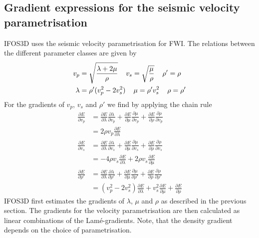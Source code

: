\subsection{Gradient expressions for the seismic velocity parametrisation}
IFOS3D uses the seismic velocity parametrisation for FWI. The relations between the different parameter classes are given by
\begin{equation}
\begin{split}
v_p & =\sqrt{\frac{\lambda+2\mu}{\rho}} \hspace{0.4cm} v_s=\sqrt{\frac{\mu}{\rho}} \hspace{0.4cm} \rho'=\rho \\
\lambda & =\rho'(v_p^2-2v_s^2) \hspace{0.4cm} \mu=\rho' v_s^2 \hspace{0.4cm} \rho=\rho'
\end{split} \end{equation}
For the gradients of $v_p$, $v_s$ and $\rho'$ we find by applying the chain rule
\begin{equation}
\begin{split}
 \frac{\partial E}{\partial v_p} & =\frac{\partial E}{\partial\lambda}\frac{\partial\lambda}{\partial v_p}+\frac{\partial E}{\partial\mu}\frac{\partial\mu}{\partial v_p}+\frac{\partial E}{\partial\rho}\frac{\partial\rho}{\partial v_p}
\\
& = 2\rho v_p\frac{\partial E}{\partial\lambda}
\\
\frac{\partial E}{\partial v_s}& =\frac{\partial E}{\partial\lambda}\frac{\partial\lambda}{\partial v_s}+\frac{\partial E}{\partial\mu}\frac{\partial\mu}{\partial v_s}+\frac{\partial E}{\partial\rho}\frac{\partial\rho}{\partial v_s}
\\
& = -4\rho v_s\frac{\partial E}{\partial\lambda}+2\rho v_s\frac{\partial E}{\partial\mu}
\\
\frac{\partial E}{\partial\rho'}& =\frac{\partial E}{\partial\lambda}\frac{\partial\lambda}{\partial\rho'}+\frac{\partial E}{\partial\mu}\frac{\partial\mu}{\partial\rho'}+\frac{\partial E}{\partial\rho}\frac{\partial\rho}{\partial\rho'}
\\
& = (v_p^2-2v_s^2)\frac{\partial E}{\partial\lambda}+v_s^2\frac{\partial E}{\partial\mu}+\frac{\partial E}{\partial\rho}
\end{split}\label{equ:grad6}
\end{equation}
IFOS3D first estimates the gradients of $\lambda$, $\mu$ and $\rho$ as described in the previous section. The gradients for the velocity parametrisation are then calculated as linear combinations of the Lam\'e-gradients. Note, that the density gradient depends on the choice of parametrisation.

